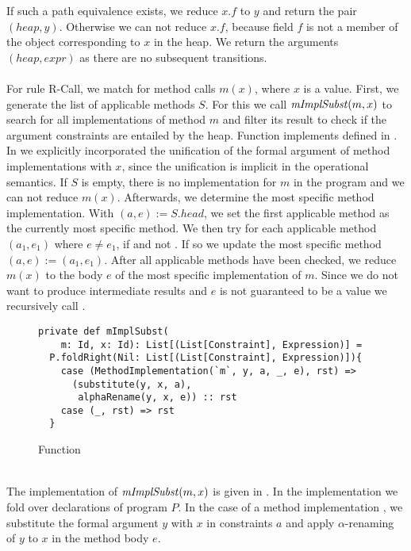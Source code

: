 If such a path equivalence exists, we
reduce $x.f$ to $y$ and return
the pair $(heap, y)$.
Otherwise we can not reduce $x.f$,
because field $f$ is not a member of the object
corresponding to $x$ in the heap.
We return the arguments $(heap, expr)$
as there are no subsequent transitions.\\
\\
For rule R-Call, we match for method calls $m(x)$,
where $x$ is a value.
First, we generate the list of applicable methods $S$.
For this we call $\mathit{mImplSubst}(m, x)$
to search for all implementations of method $m$
and filter its result to check if the
argument constraints are entailed by the heap.
Function  implements 
defined in .
In  we explicitly incorporated the unification
of the formal argument of method implementations with $x$,
since the unification is implicit in the operational semantics.
If $S$ is empty, there is no implementation for $m$ in the program
and we can not reduce $m(x)$.
Afterwards, we determine the most specific method implementation.
With $(a, e) := S.head$, we set the first applicable method
as the currently most specific method.
We then try for each applicable method $(a_1, e_1)$ where $e \not= e_1$,
if  and not .
If so we update the most specific method $(a, e) := (a_1, e_1)$.
After all applicable methods have been checked, we reduce
$m(x)$ to the body $e$ of the most specific implementation of $m$.
Since we do not want to produce intermediate results and $e$
is not guaranteed to be a value we recursively call .
%
\begin{figure}[h]
\begin{lstlisting}
private def mImplSubst(
    m: Id, x: Id): List[(List[Constraint], Expression)] =
  P.foldRight(Nil: List[(List[Constraint], Expression)]){
    case (MethodImplementation(`m`, y, a, _, e), rst) =>
      (substitute(y, x, a),
       alphaRename(y, x, e)) :: rst
    case (_, rst) => rst
  }
\end{lstlisting}
\caption{Function }
\label{fig:scala-mimpl}
\end{figure}\\
%
The implementation of $\mathit{mImplSubst}(m, x)$ is given in .
In the implementation we fold over declarations of program $P$.
In the case of a method implementation ,
we substitute the formal argument $y$ with $x$ in constraints $a$
and apply $\alpha$-renaming of $y$ to $x$ in the method body $e$.\\
